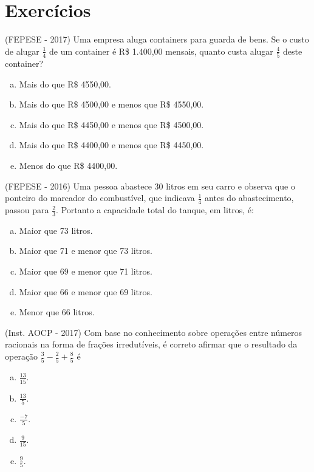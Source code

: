  \section{Exercícios}
 \begin{exer}
 (FEPESE - 2017) Uma empresa aluga containers para guarda de bens. Se o custo de alugar $\frac{1}{4}$ de   um container é R\$ 1.400,00 mensais, quanto custa alugar $\frac{4}{5}$ deste container?
  \begin{enumerate}[a)]
  \item Mais do que R\$ 4550,00.
  \item Mais do que R\$ 4500,00 e menos que R\$ 4550,00.
  \item Mais do que R\$ 4450,00 e menos que R\$ 4500,00.
  \item Mais do que R\$ 4400,00 e menos que R\$ 4450,00.
  \item Menos do que R\$ 4400,00.
  \end{enumerate}
 \end{exer}

 \begin{exer}
 (FEPESE - 2016) Uma pessoa abastece 30 litros em seu carro e observa que o ponteiro do marcador do combustível, que indicava $\frac{1}{4}$ antes do abastecimento, passou para $\frac{2}{3}$. Portanto a capacidade total do tanque, em litros, é:
  \begin{enumerate}[a)]
  \item Maior que 73 litros.
  \item Maior que 71 e menor que 73 litros.
  \item Maior que 69 e menor que 71 litros.
  \item Maior que 66 e menor que 69 litros.
  \item Menor que 66 litros.
  \end{enumerate}
 \end{exer}

 \begin{exer}
 (Inst. AOCP - 2017) Com base no conhecimento sobre operações entre números racionais na forma de frações irredutíveis, é correto afirmar que o resultado da operação $\frac{3}{5} - \frac{2}{5} + \frac{8}{5}$  é
  \begin{enumerate}[a)]
  \item $\frac{13}{15}$.
  \item $\frac{13}{5}$.
  \item $\frac{-7}{5}$.
  \item $\frac{9}{15}$.
  \item $\frac{9}{5}$.
  \end{enumerate}
 \end{exer}

